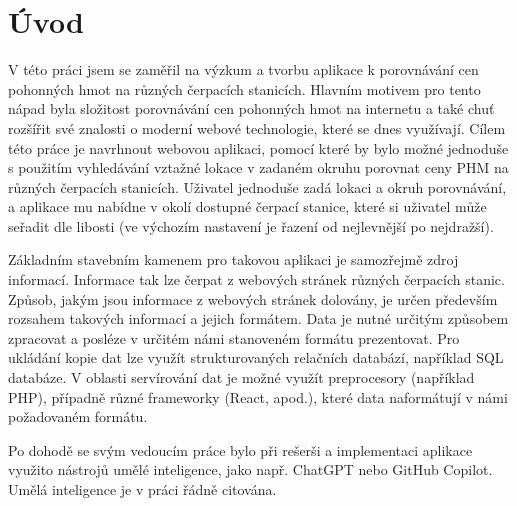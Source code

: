 \chapter{Úvod}
\label{ch:Introduction}

V této práci jsem se zaměřil na výzkum a tvorbu aplikace k porovnávání cen
pohonných hmot na různých čerpacích stanicích. Hlavním motivem pro tento
nápad byla složitost porovnávání cen pohonných hmot na internetu a také chuť
rozšířit své znalosti o moderní webové technologie, které se dnes využívají.
Cílem této práce je navrhnout webovou aplikaci, pomocí které by bylo možné
jednoduše s použitím vyhledávání vztažné lokace v zadaném okruhu porovnat
ceny PHM na různých čerpacích stanicích. Uživatel jednoduše zadá lokaci
a okruh porovnávání, a aplikace mu nabídne v okolí dostupné čerpací stanice,
které si uživatel může seřadit dle libosti (ve výchozím nastavení je řazení
od nejlevnější po nejdražší).

Základním stavebním kamenem pro takovou aplikaci je samozřejmě zdroj 
informací. Informace tak lze čerpat z webových stránek různých čerpacích
stanic. Způsob, jakým jsou informace z webových stránek dolovány, je určen
především rozsahem takových informací a jejich formátem. Data je nutné
určitým způsobem zpracovat a posléze v určitém námi stanoveném formátu
prezentovat. Pro ukládání kopie dat lze využít strukturovaných relačních
databází, například SQL databáze. V oblasti servírování dat je možné využít
preprocesory (například PHP), případně různé frameworky (React, apod.),
které data naformátují v námi požadovaném formátu.

Po dohodě se svým vedoucím práce bylo při rešerši a implementaci aplikace
využito nástrojů umělé inteligence, jako např. ChatGPT nebo GitHub Copilot.
Umělá inteligence je v práci řádně citována.

\endinput
